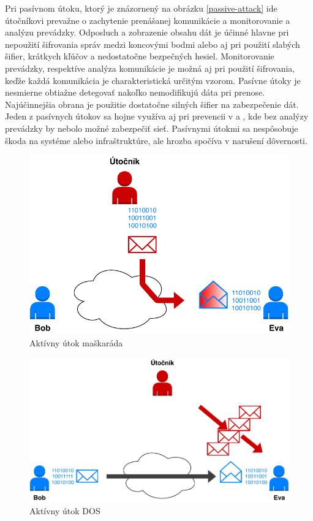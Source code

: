 Pri pasívnom útoku, ktorý je znázornený na obrázku \ref{passive-attack} ide útočníkovi prevažne o zachytenie prenášanej komunikácie a monitorovanie a  analýzu prevádzky. Odposluch a zobrazenie obsahu dát je účinné hlavne pri nepoužití šifrovania správ medzi koncovými bodmi alebo aj pri použití slabých šifier, krátkych kľúčov a nedostatočne bezpečných hesiel. Monitorovanie prevádzky, respektíve analýza komunikácie je možná aj pri použití šifrovania, keďže každá komunikácia je charakteristická určitým vzorom. Pasívne útoky je nesmierne obtiažne detegovať nakoľko nemodifikujú dáta pri prenose. Najúčinnejšia obrana je použitie dostatočne silných šifier na zabezpečenie dát. Jeden z pasívnych útokov sa hojne využíva aj pri prevencii v  a , kde bez analýzy prevádzky by nebolo možné zabezpečiť sieť. Pasívnymi útokmi sa nespôsobuje škoda na systéme alebo infraštruktúre, ale hrozba spočíva v narušení dôvernosti.

\begin{figure}[H]
	\begin{center}
		\includegraphics[scale=0.65]{obrazky/active-attack-masq.pdf}
	\end{center}
	\caption[Aktívny útok maškaráda]{Aktívny útok maškaráda}
	\label{active-attack-masq}
\end{figure}

\begin{figure}[H]
	\begin{center}
		\includegraphics[scale=0.65]{obrazky/active-attack-dos.pdf}
	\end{center}
	\caption[Aktívny útok DOS]{Aktívny útok DOS}
	\label{active-attack-dos}
\end{figure}

